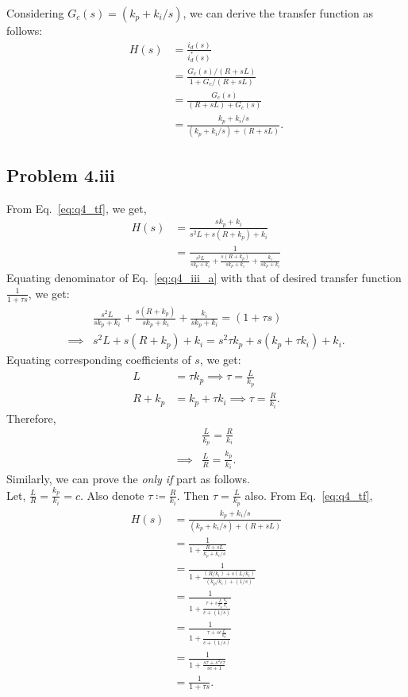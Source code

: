 Considering $G_c(s)=(k_p+k_i/s)$, we can derive the transfer function as follows:
\begin{align}\label{eq:q4_tf}
	H(s) &= \frac{i_d(s)}{i_d^*(s)} \nonumber\\
	&= \frac{G_c(s)/(R+sL)}{1+G_c/(R+sL)} \nonumber\\
	&= \frac{G_c(s)}{(R+sL)+G_c(s)} \nonumber\\
	&= \frac{k_p+k_i/s}{(k_p+k_i/s)+(R+sL)}.
\end{align}
\subsection*{Problem 4.iii}
From Eq.~\ref{eq:q4_tf}, we get,
\begin{align}\label{eq:q4_iii_a}
	H(s) &= \frac{sk_p+k_i}{s^2L+s(R+k_p)+k_i} \nonumber\\
	&= \frac{1}{\frac{s^2L}{sk_p+k_i}+\frac{s(R+k_p)}{sk_p+k_i}+\frac{k_i}{sk_p+k_i}}
\end{align}
Equating denominator of Eq.~\ref{eq:q4_iii_a} with that of desired transfer function $\frac{1}{1+\tau s}$, we get:
\begin{align*}
	&\frac{s^2L}{sk_p+k_i}+\frac{s(R+k_p)}{sk_p+k_i}+\frac{k_i}{sk_p+k_i} = (1+\tau s)\\
	\implies & s^2L+s(R+k_p)+k_i = s^2 \tau k_p + s(k_p+\tau k_i)+k_i.
\end{align*}
Equating corresponding coefficients of $s$, we get:
\begin{align*}
	L &= \tau k_p \implies \tau = \frac{L}{k_p}\\
	R+k_p &= k_p+\tau k_i \implies \tau = \frac{R}{k_i}.
\end{align*}
Therefore,
\begin{align*}
	&\frac{L}{k_p} = \frac{R}{k_i}\\
	\implies & \frac{L}{R} = \frac{k_p}{k_i}.
\end{align*}
Similarly, we can prove the \textit{only if} part as follows.\\
Let, $\frac{L}{R}=\frac{k_p}{k_i}=c$. Also denote $\tau \coloneqq \frac{R}{k_i}$. Then $\tau = \frac{L}{k_p}$ also. From Eq.~\ref{eq:q4_tf},
\begin{align*}
	H(s) &= \frac{k_p+k_i/s}{(k_p+k_i/s)+(R+sL)}\\
	&= \frac{1}{1+\frac{R+sL}{k_p+k_i/s}}\\
	&= \frac{1}{1+\frac{(R/k_i)+s(L/k_i)}{(k_p/k_i)+(1/s)}}\\
	&= \frac{1}{1+\frac{\tau+s\frac{L}{k_p}\frac{k_p}{k_i}}{c+(1/s)}}\\
	&= \frac{1}{1+\frac{\tau + sc\frac{L}{k_p}}{c+(1/s)}}\\
	&= \frac{1}{1+\frac{s\tau+s^2c\tau}{sc+1}}\\
	&= \frac{1}{1+\tau s}.
\end{align*}
